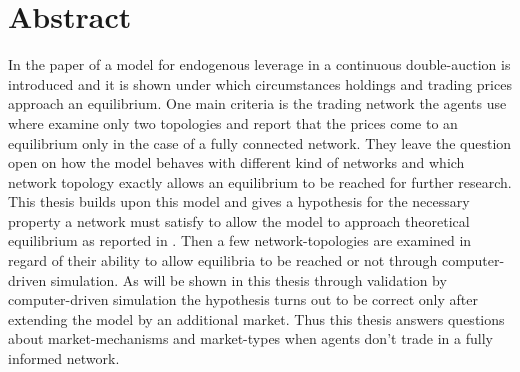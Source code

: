 \documentclass[Bachelorarbeit.tex]{subfiles}
\begin{document}
\chapter*{Abstract}
In the paper of \cite{Breuer2015} a model for endogenous leverage in a continuous double-auction is introduced and it is shown under which circumstances holdings and trading prices approach an equilibrium. One main criteria is the trading network the agents use where \cite{Breuer2015} examine only two topologies and report that the prices come to an equilibrium only in the case of a fully connected network. They leave the question open on how the model behaves with different kind of networks and which network topology exactly allows an equilibrium to be reached  for further research. This thesis builds upon this model and gives a hypothesis for the necessary property a network must satisfy to allow the model to approach theoretical equilibrium as reported in \cite{Breuer2015}. Then a few network-topologies are examined in regard of their ability to allow equilibria to be reached or not through computer-driven simulation. As will be shown in this thesis through validation by computer-driven simulation the hypothesis turns out to be correct only after extending the model by an additional market. Thus this thesis answers questions about market-mechanisms and market-types when agents don't trade in a fully informed network. 
\end{document}
